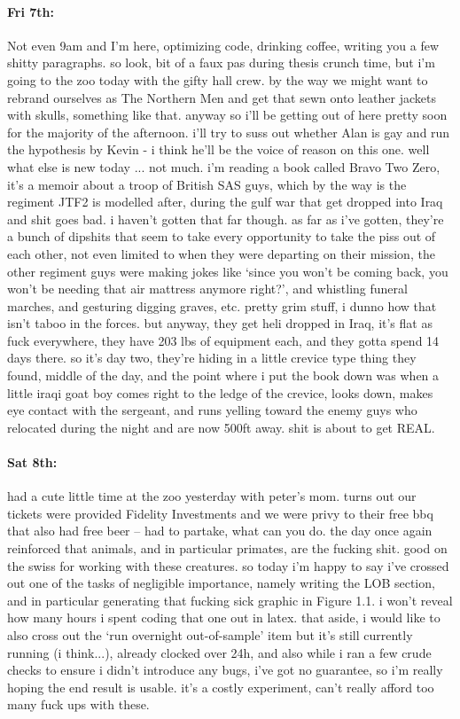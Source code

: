 \documentclass[12pt]{article}
\begin{document}
\paragraph{Fri 7th:} Not even 9am and I'm here, optimizing code, drinking coffee, writing you a few shitty paragraphs. so look, bit of a faux pas during thesis crunch time, but i'm going to the zoo today with the gifty hall crew. by the way we might want to rebrand ourselves as The Northern Men and get that sewn onto leather jackets with skulls, something like that. anyway so i'll be getting out of here pretty soon for the majority of the afternoon. i'll try to suss out whether Alan is gay and run the hypothesis by Kevin - i think he'll be the voice of reason on this one. well what else is new today ... not much. i'm reading a book called Bravo Two Zero, it's a memoir about a troop of British SAS guys, which by the way is the regiment JTF2 is modelled after, during the gulf war that get dropped into Iraq and shit goes bad. i haven't gotten that far though. as far as i've gotten, they're a bunch of dipshits that seem to take every opportunity to take the piss out of each other, not even limited to when they were departing on their mission, the other regiment guys were making jokes like `since you won't be coming back, you won't be needing that air mattress anymore right?', and whistling funeral marches, and gesturing digging graves, etc. pretty grim stuff, i dunno how that isn't taboo in the forces. but anyway, they get heli dropped in Iraq, it's flat as fuck everywhere, they have 203 lbs of equipment each, and they gotta spend 14 days there. so it's day two, they're hiding in a little crevice type thing they found, middle of the day, and the point where i put the book down was when a little iraqi goat boy comes right to the ledge of the crevice, looks down, makes eye contact with the sergeant, and runs yelling toward the enemy guys who relocated during the night and are now 500ft away. shit is about to get REAL.

\paragraph{Sat 8th:} had a cute little time at the zoo yesterday with peter's mom. turns out our tickets were provided Fidelity Investments and we were privy to their free bbq that also had free beer -- had to partake, what can you do. the day once again reinforced that animals, and in particular primates, are the fucking shit. good on the swiss for working with these creatures. so today i'm happy to say i've crossed out one of the tasks of negligible importance, namely writing the LOB section, and in particular generating that fucking sick graphic in Figure 1.1. i won't reveal how many hours i spent coding that one out in latex. that aside, i would like to also cross out the `run overnight out-of-sample' item but it's still currently running (i think...), already clocked over 24h, and also while i ran a few crude checks to ensure i didn't introduce any bugs, i've got no guarantee, so i'm really hoping the end result is usable. it's a costly experiment, can't really afford too many fuck ups with these. 
\end{document}
